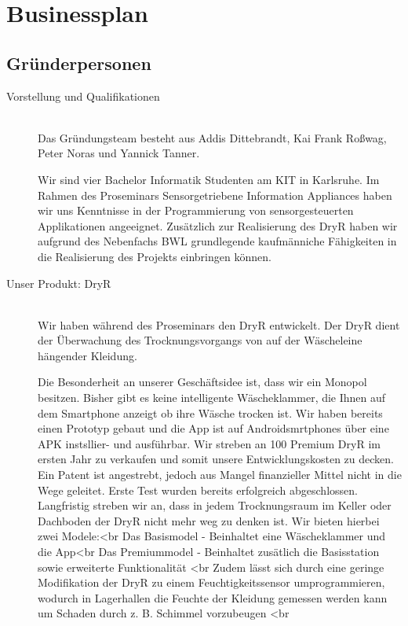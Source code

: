 \section{Businessplan}
\subsection{Gründerpersonen}
\begin{description}
	\item [Vorstellung und Qualifikationen] \hfill \\
		Das Gründungsteam besteht aus Addis Dittebrandt, Kai Frank Roßwag, Peter Noras und Yannick Tanner.
		\begin{description}
			Wir sind vier Bachelor Informatik Studenten am KIT in Karlsruhe. Im Rahmen des Proseminars Sensorgetriebene Information Appliances haben wir uns Kenntnisse in der Programmierung von sensorgesteuerten Applikationen angeeignet. Zusätzlich zur Realisierung des DryR haben wir aufgrund des Nebenfachs BWL grundlegende kaufmänniche Fähigkeiten in die Realisierung des Projekts einbringen können.
		\end{description}
	\item [Unser Produkt: DryR] \hfill \\
		Wir haben während des Proseminars den DryR entwickelt. Der DryR dient der Überwachung des Trocknungsvorgangs von auf der Wäscheleine hängender Kleidung. 
		\begin{description}
			Die Besonderheit an unserer Geschäftsidee ist, dass wir ein Monopol besitzen. Bisher gibt es keine intelligente Wäscheklammer, die Ihnen auf dem Smartphone anzeigt ob ihre Wäsche trocken ist. Wir haben bereits einen Prototyp gebaut und die App ist auf Androidsmrtphones über eine APK instsllier- und ausführbar. Wir streben an 100 Premium DryR im ersten Jahr zu verkaufen und somit unsere Entwicklungskosten zu decken. Ein Patent ist angestrebt, jedoch aus Mangel finanzieller Mittel nicht in die Wege geleitet. Erste Test wurden bereits erfolgreich abgeschlossen. Langfristig streben wir an, dass in jedem Trocknungsraum im Keller oder Dachboden der DryR nicht mehr weg zu denken ist. Wir bieten hierbei zwei Modele:<br\> 
Das Basismodel - Beinhaltet eine Wäscheklammer und die App<br\>
Das Premiummodel - Beinhaltet zusätlich die Basisstation sowie erweiterte Funktionalität <br\>
Zudem lässt sich durch eine geringe Modifikation der DryR zu einem Feuchtigkeitssensor umprogrammieren, wodurch in Lagerhallen die Feuchte der Kleidung gemessen werden kann um Schaden durch z. B. Schimmel vorzubeugen <br\>

\end{description}
\end{description}
